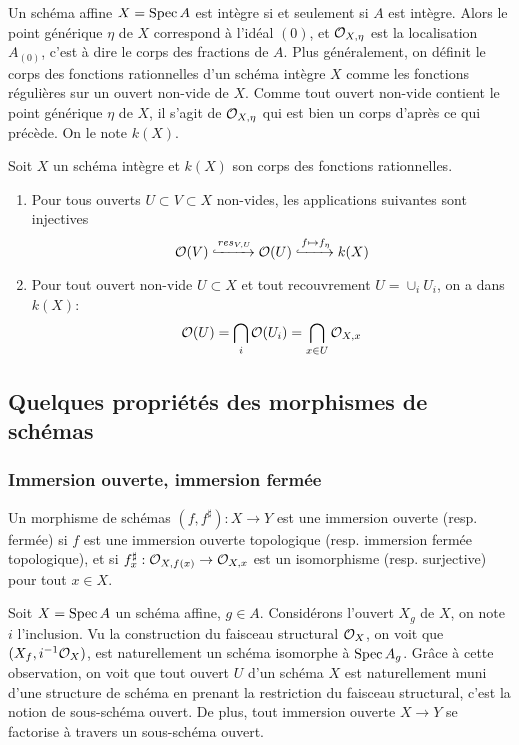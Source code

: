 Un schéma affine $X=\operatorname{Spec} A$ est intègre si et seulement si $A$ est intègre. Alors le point générique $\eta$ de $X$ correspond à l'idéal $(0)$, et $\mathcal{O}_{X,\eta}$ est la localisation $A_{(0)}$, c'est à dire le corps des fractions de $A$. Plus généralement, on définit le corps des fonctions rationnelles d'un schéma intègre $X$ comme les fonctions régulières sur un ouvert non-vide de $X$. Comme tout ouvert non-vide contient le point générique $\eta$ de $X$, il s'agit de $\mathcal{O}_{X,\eta}$ qui est bien un corps d'après ce qui précède. On le note $k(X)$.

\begin{prop}
Soit $X$ un schéma intègre et $k(X)$ son corps des fonctions rationnelles. 
\begin{enumerate}
\item Pour tous ouverts $U\subset V\subset X$ non-vides, les applications suivantes sont injectives
$$\mathcal{O}(V)\xhookrightarrow{res_{V,U}}\mathcal{O}(U)\xhookrightarrow{f\mapsto f_\eta} k(X)$$
\item Pour tout ouvert non-vide $U\subset X$ et tout recouvrement $U=\cup_i U_i$, on a dans $k(X)$:
$$\mathcal{O}(U)=\bigcap_i \mathcal{O}(U_i)=\bigcap_{x\in U}\mathcal{O}_{X,x}$$
\end{enumerate}
\end{prop}

\subsection{Quelques propriétés des morphismes de schémas}

\subsubsection{Immersion ouverte, immersion fermée}

\begin{defn}
Un morphisme de schémas $(f,f^\sharp):X\rightarrow Y$ est une immersion ouverte (resp. fermée) si $f$ est une immersion ouverte topologique (resp. immersion fermée topologique), et si $f^\sharp_x:\mathcal{O}_{X,f(x)}\rightarrow \mathcal{O}_{X,x}$ est un isomorphisme (resp. surjective) pour tout $x\in X$.
\end{defn}

Soit $X=\operatorname{Spec} A$ un schéma affine, $g\in A$. Considérons l'ouvert $X_g$ de $X$, on note $i$ l'inclusion. Vu la construction du faisceau structural $\mathcal{O}_X$, on voit que $(X_f, i^{-1}\mathcal{O}_X)$, est naturellement un schéma isomorphe à $\operatorname{Spec} A_g$. Grâce à cette observation, on voit que tout ouvert $U$ d'un schéma $X$ est naturellement muni d'une structure de schéma en prenant la restriction du faisceau structural, c'est la notion de sous-schéma ouvert. De plus, tout immersion ouverte $X\rightarrow Y$ se factorise à travers un sous-schéma ouvert.

